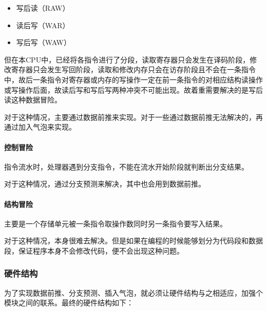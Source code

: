 \begin{itemize}
\itemsep1pt\parskip0pt
\item
  写后读（RAW）
\item
  读后写（WAR）
\item
  写后写（WAW）
\end{itemize}

但在本CPU中，已经将各指令进行了分段，读取寄存器只会发生在译码阶段，修改寄存器只会发生写回阶段，读取和修改内存只会在访存阶段且不会在一条指令中，故后一条指令对寄存器或内存的写操作一定在前一条指令的对相应结构读操作或写操作后面，故读后写和写后写两种冲突不可能出现。故着重需要解决的是写后读这种数据冒险。

对于这种情况，主要通过数据前推来实现。对于一些通过数据前推无法解决的，再通过加入气泡来实现。

\paragraph{控制冒险}\label{ux63a7ux5236ux5192ux9669}

指令流水时，处理器遇到分支指令，不能在流水开始阶段就判断出分支结果。

对于这种情况，通过分支预测来解决，其中也会用到数据前推。

\paragraph{结构冒险}\label{ux7ed3ux6784ux5192ux9669}

主要是一个存储单元被一条指令取操作数同时另一条指令要写入结果。

对于这种情况，本身很难去解决。但是如果在编程的时候能够划分为代码段和数据段，保证程序本身不会修改代码，便不会出现这种问题。

\subsubsection{硬件结构}\label{ux786cux4ef6ux7ed3ux6784-1}

为了实现数据前推、分支预测、插入气泡，就必须让硬件结构与之相适应，加强个模块之间的联系。最终的硬件结构如下：

